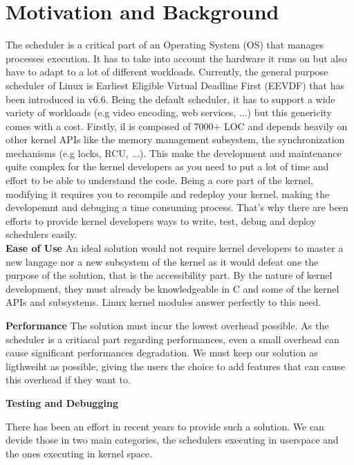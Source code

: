 \section{Motivation and Background}

\par The scheduler is a critical part of an Operating System (OS) that manages processes execution. It has to take into account the hardware it runs on but also have to adapt to a lot of different workloads. Currently, the general purpose scheduler of Linux is Earliest Eligible Virtual Deadline First (EEVDF) that has been introduced in v6.6. Being the default scheduler, it has to support a wide variety of workloads (e.g video encoding, web services,  ...) but this genericity comes with a cost. Firstly, il is composed of 7000+ LOC and depends heavily on other kernel APIs like the memory management subsystem, the synchronization mechanisms (e.g locks, RCU, ...). This make the development and maintenance quite complex for the kernel developers as you need to put a lot of time and effort to be able to understand the code. Being a core part of the kernel, modifying it requires you to recompile and redeploy your kernel, making the developemnt and debuging a time consuming process. That's why there are been efforts to provide kernel developers ways to write, test, debug and deploy schedulers easily. \\ \newline
\textbf{Ease of Use} An ideal solution would not require kernel developers to master a new langage nor a new subsystem of the kernel as it would defeat one the purpose of the solution, that is the accessibility part. By the nature of kernel development, they must already be knowledgeable in C and some of the kernel APIs and subsystems. Linux kernel modules answer perfectly to this need.

\textbf{Performance} The solution must incur the lowest overhead possible. As the scheduler is a critiacal part regarding performances, even a small overhead can cause significant performances degradation. We must keep our solution as ligthweiht as possible, giving the users the choice to add features that can cause this overhead if they want to.

\textbf{Testing and Debugging}


\par There has been an effort in recent years to provide such a solution. We can devide those in two main categories, the schedulers executing in userspace and the ones executing in kernel space. \\

